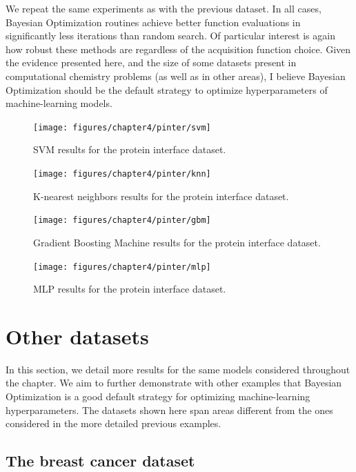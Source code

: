 \documentclass[10pt,a4paper,twoside]{book}
\begin{document}
We repeat the same experiments as with the previous dataset. In all cases, Bayesian Optimization routines achieve better function evaluations in significantly less iterations than random search. Of particular interest is again how robust these methods are regardless of the acquisition function choice. Given the evidence presented here, and the size of some datasets present in computational chemistry problems (as well as in other areas), I believe Bayesian Optimization should be the default strategy to optimize hyperparameters of machine-learning models.

\begin{figure}
\centering
\caption{SVM results for the protein interface dataset.}
\texttt{[image: figures/chapter4/pinter/svm]}
\label{fig:affsvm}
\end{figure}

\begin{figure}
\centering
\caption{K-nearest neighbors results for the protein interface dataset.}
\texttt{[image: figures/chapter4/pinter/knn]}
\label{fig:affknn}
\end{figure}

\begin{figure}
\centering
\caption{Gradient Boosting Machine results for the protein interface dataset.}
\texttt{[image: figures/chapter4/pinter/gbm]}
\label{fig:affgbm}
\end{figure}

\begin{figure}
\centering
\caption{MLP results for the protein interface dataset.}
\texttt{[image: figures/chapter4/pinter/mlp]}
\label{fig:affmlp}
\end{figure}

\section{Other datasets}

In this section, we detail more results for the same models considered throughout the chapter. We aim to further demonstrate with other examples that Bayesian Optimization is a good default strategy for optimizing machine-learning hyperparameters. The datasets shown here span areas different from the ones considered in the more detailed previous examples.

\subsection{The breast cancer dataset}
\end{document}
